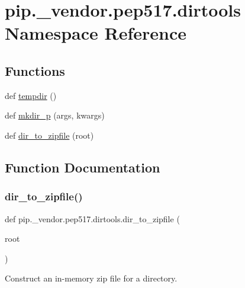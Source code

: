 \hypertarget{namespacepip_1_1__vendor_1_1pep517_1_1dirtools}{}\section{pip.\+\_\+vendor.\+pep517.\+dirtools Namespace Reference}
\label{namespacepip_1_1__vendor_1_1pep517_1_1dirtools}
\subsection*{Functions}
\begin{DoxyCompactItemize}
\item 
def \hyperlink{namespacepip_1_1__vendor_1_1pep517_1_1dirtools_a5742a1a2b5646e0b29984f2f1cbdf26b}{tempdir} ()
\item 
def \hyperlink{namespacepip_1_1__vendor_1_1pep517_1_1dirtools_a13db395847612303ce90399cea748a1d}{mkdir\+\_\+p} (args, kwargs)
\item 
def \hyperlink{namespacepip_1_1__vendor_1_1pep517_1_1dirtools_a3750b1d846c446df86b75760531de5fa}{dir\+\_\+to\+\_\+zipfile} (root)
\end{DoxyCompactItemize}


\subsection{Function Documentation}
\mbox{\label{namespacepip_1_1__vendor_1_1pep517_1_1dirtools_a3750b1d846c446df86b75760531de5fa}} 
\subsubsection{\texorpdfstring{dir\+\_\+to\+\_\+zipfile()}{dir\_to\_zipfile()}}
{\footnotesize\ttfamily def pip.\+\_\+vendor.\+pep517.\+dirtools.\+dir\+\_\+to\+\_\+zipfile (\begin{DoxyParamCaption}\item[{}]{root }\end{DoxyParamCaption})}

\begin{DoxyVerb}Construct an in-memory zip file for a directory.\end{DoxyVerb}
 \mbox{\label{namespacepip_1_1__vendor_1_1pep517_1_1dirtools_a13db395847612303ce90399cea748a1d}} 
